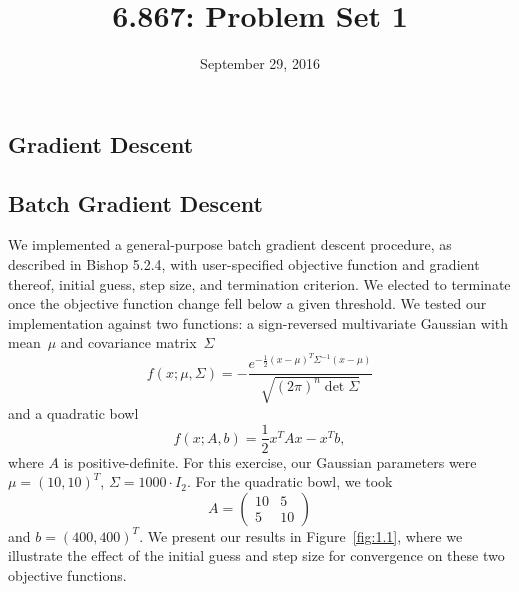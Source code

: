 \documentclass{article}
\title{6.867: Problem Set 1}
\date{September 29, 2016}
\begin{document}
\maketitle

\begin{multicols}{2}

\section{Gradient Descent}

\subsection{Batch Gradient Descent}

We implemented a general-purpose batch gradient descent procedure, as described in Bishop 5.2.4, with user-specified objective function and gradient thereof, initial guess, step size, and termination criterion.
We elected to terminate once the objective function change fell below a given threshold.
We tested our implementation against two functions: a sign-reversed multivariate Gaussian with mean~$\mu$ and covariance matrix~$\Sigma$
\begin{equation}
f(x; \mu, \Sigma) = -\frac{e^{-\frac12(x - \mu)^T \Sigma^{-1}(x - \mu)}}{\sqrt{(2\pi)^n \det\Sigma}}
\end{equation}
and a quadratic bowl
\begin{equation}
f(x; A, b) = \frac{1}{2}x^T Ax - x^T b,
\end{equation}
where $A$ is positive-definite.
For this exercise, our Gaussian parameters were $\mu = (10, 10)^T$, $\Sigma = 1000 \cdot I_2$.
For the quadratic bowl, we took
\[A = \left(\begin{array}{cc}10 & 5 \\5 & 10\end{array}\right)\]
and $b = (400, 400)^T$.
We present our results in Figure~\ref{fig:1.1}, where we illustrate the effect of the initial guess and step size for convergence on these two objective functions.


\end{multicols}
\end{document}
